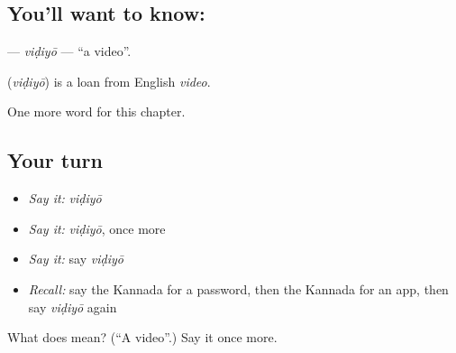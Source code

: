 \subsection*{You'll want to know: }
\textbf{} — \emph{viḍiyō} — \textquotedblleft{}a video\textquotedblright{}.

\begin{cousinweb}
\textbf{} (\emph{viḍiyō}) is a loan from English \emph{video}.
\end{cousinweb}

\begin{grammarlens}[title={What you've built}]
One more word for this chapter.
\end{grammarlens}

\subsection*{Your turn}
\begin{itemize}
\raggedright
  \item \emph{Say it:} \emph{viḍiyō}
  \item \emph{Say it:} \emph{viḍiyō}, once more
  \item \emph{Say it:} say \emph{viḍiyō}
  \item \emph{Recall:} say the Kannada for a password, then the Kannada for an app, then say \emph{viḍiyō} again
\end{itemize}

\begin{tcolorbox}[breakable,colback=teal!4,colframe=teal!35!black,title={Before you move on}]
What does  mean? (\textquotedblleft{}A video\textquotedblright{}.) Say it once more.
\end{tcolorbox}
